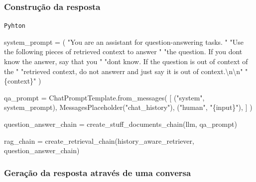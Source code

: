 \documentclass[
  letterpaper,
  DIV=11,
  numbers=noendperiod]{scrartcl}
\newenvironment{Shaded}{\begin{snugshade}}{\end{snugshade}}
\newcommand{\CharTok}[1]{\textcolor[rgb]{0.13,0.47,0.30}{#1}}
\newcommand{\NormalTok}[1]{\textcolor[rgb]{0.00,0.23,0.31}{#1}}
\newcommand{\OperatorTok}[1]{\textcolor[rgb]{0.37,0.37,0.37}{#1}}
\newcommand{\SpecialCharTok}[1]{\textcolor[rgb]{0.37,0.37,0.37}{#1}}
\newcommand{\StringTok}[1]{\textcolor[rgb]{0.13,0.47,0.30}{#1}}
\begin{document}
\hypertarget{construuxe7uxe3o-da-resposta}{%
\subsubsection{Construção da
resposta}\label{construuxe7uxe3o-da-resposta}}

\begin{codelisting}

\caption{\texttt{Pyhton}}

\begin{Shaded}
\begin{Highlighting}[]
\NormalTok{system\_prompt }\OperatorTok{=}\NormalTok{ (}
    \StringTok{"You are an assistant for question{-}answering tasks. "}
    \StringTok{"Use the following pieces of retrieved context to answer "}
    \StringTok{"the question. If you don\textquotesingle{}t know the answer, say that you "}
    \StringTok{"don\textquotesingle{}t know. If the question is out of context of the "}
    \StringTok{"retrieved context, do not answerr and just say it is out of context.}\CharTok{\textbackslash{}n\textbackslash{}n}\StringTok{"}
    \StringTok{"}\SpecialCharTok{\{context\}}\StringTok{"}
\NormalTok{)}

\NormalTok{qa\_prompt }\OperatorTok{=}\NormalTok{ ChatPromptTemplate.from\_messages(}
\NormalTok{    [}
\NormalTok{        (}\StringTok{"system"}\NormalTok{, system\_prompt),}
\NormalTok{        MessagesPlaceholder(}\StringTok{"chat\_history"}\NormalTok{),}
\NormalTok{        (}\StringTok{"human"}\NormalTok{, }\StringTok{"}\SpecialCharTok{\{input\}}\StringTok{"}\NormalTok{),}
\NormalTok{    ]}
\NormalTok{)}

\NormalTok{question\_answer\_chain }\OperatorTok{=}\NormalTok{ create\_stuff\_documents\_chain(llm, qa\_prompt)}

\NormalTok{rag\_chain }\OperatorTok{=}\NormalTok{ create\_retrieval\_chain(history\_aware\_retriever, question\_answer\_chain)}
\end{Highlighting}
\end{Shaded}

\end{codelisting}

\hypertarget{gerauxe7uxe3o-da-resposta-atravuxe9s-de-uma-conversa}{%
\subsubsection{Geração da resposta através de uma
conversa}\label{gerauxe7uxe3o-da-resposta-atravuxe9s-de-uma-conversa}}
\end{document}
